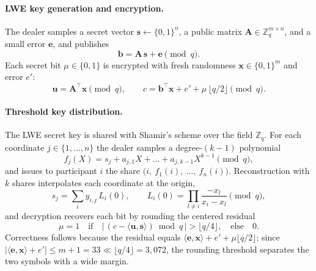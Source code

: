 \documentclass[runningheads]{llncs}
\begin{document}
\paragraph{LWE key generation and encryption.}
The dealer samples a secret vector $\mathbf{s} \gets \{0,1\}^n$, a public
matrix $\mathbf{A} \in \mathbb{Z}_q^{m \times n}$, and a small error
$\mathbf{e}$, and publishes
\begin{equation}
  \mathbf{b} = \mathbf{A}\,\mathbf{s} + \mathbf{e} \pmod{q}.
  \label{eq:key}
\end{equation}
Each secret bit $\mu \in \{0,1\}$ is encrypted with fresh randomness
$\mathbf{x} \in \{0,1\}^m$ and error $e'$:
\begin{equation}
  \mathbf{u} = \mathbf{A}^{\!\top}\mathbf{x} \pmod{q},
  \qquad
  c = \mathbf{b}^{\!\top}\mathbf{x} + e' + \mu\,\lfloor q/2 \rfloor \pmod{q}.
  \label{eq:enc}
\end{equation}

\paragraph{Threshold key distribution.}
The LWE secret key is shared with Shamir's scheme over the field
$\mathbb{Z}_q$. For each coordinate $j \in \{1,\dots,n\}$ the dealer samples a
degree-$(k-1)$ polynomial
\begin{equation}
  f_j(X) = s_j + a_{j,1}X + \dots + a_{j,k-1}X^{k-1} \pmod{q},
  \label{eq:poly}
\end{equation}
and issues to participant $i$ the share
$\bigl(i,\ f_1(i),\ \dots,\ f_n(i)\bigr)$. Reconstruction with $k$ shares
interpolates each coordinate at the origin,
\begin{equation}
  s_j = \sum_i y_{i,j}\,L_i(0),
  \qquad
  L_i(0) = \prod_{l \neq i} \frac{-x_l}{x_i - x_l} \pmod{q},
  \label{eq:lagrange}
\end{equation}
and decryption recovers each bit by rounding the centered residual
\begin{equation}
  \mu = 1 \quad\text{if}\quad
  \bigl|\,(c - \langle \mathbf{u}, \mathbf{s}\rangle) \bmod q\,\bigr|
  > \lfloor q/4 \rfloor, \quad\text{else}\quad 0.
  \label{eq:dec}
\end{equation}
Correctness follows because the residual equals
$\langle \mathbf{e}, \mathbf{x}\rangle + e' + \mu\lfloor q/2\rfloor$; since
$|\langle \mathbf{e}, \mathbf{x}\rangle + e'| \le m + 1 = 33 \ll \lfloor q/4
\rfloor = 3{,}072$, the rounding threshold separates the two symbols with a
wide margin.
\end{document}
